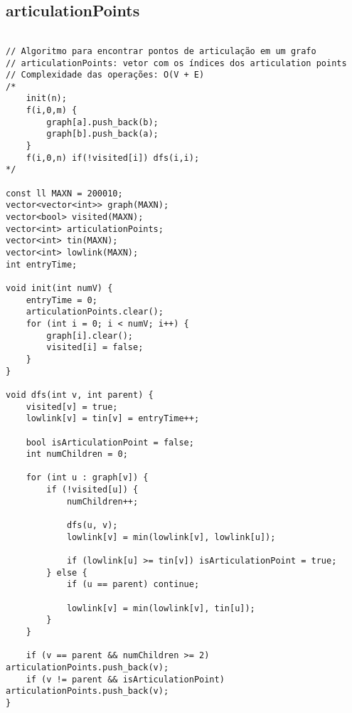 \documentclass[landscape,twocolumn,10pt,a4paper]{article}
\begin{document}
\subsection{articulationPoints}
\begin{verbatim}

// Algoritmo para encontrar pontos de articulação em um grafo
// articulationPoints: vetor com os índices dos articulation points
// Complexidade das operações: O(V + E)
/*
    init(n);
    f(i,0,m) {
        graph[a].push_back(b);
        graph[b].push_back(a);
    }
    f(i,0,n) if(!visited[i]) dfs(i,i);
*/

const ll MAXN = 200010;
vector<vector<int>> graph(MAXN);
vector<bool> visited(MAXN);
vector<int> articulationPoints;
vector<int> tin(MAXN);
vector<int> lowlink(MAXN);
int entryTime;

void init(int numV) {
    entryTime = 0;
    articulationPoints.clear();
    for (int i = 0; i < numV; i++) {
        graph[i].clear();
        visited[i] = false;
    }
}

void dfs(int v, int parent) {
    visited[v] = true;
    lowlink[v] = tin[v] = entryTime++;

    bool isArticulationPoint = false;
    int numChildren = 0;

    for (int u : graph[v]) {
        if (!visited[u]) {
            numChildren++;
            
            dfs(u, v);
            lowlink[v] = min(lowlink[v], lowlink[u]);

            if (lowlink[u] >= tin[v]) isArticulationPoint = true;
        } else {
            if (u == parent) continue;

            lowlink[v] = min(lowlink[v], tin[u]);
        }
    }

    if (v == parent && numChildren >= 2) articulationPoints.push_back(v);
    if (v != parent && isArticulationPoint) articulationPoints.push_back(v);
}


\end{verbatim}
\end{document}
